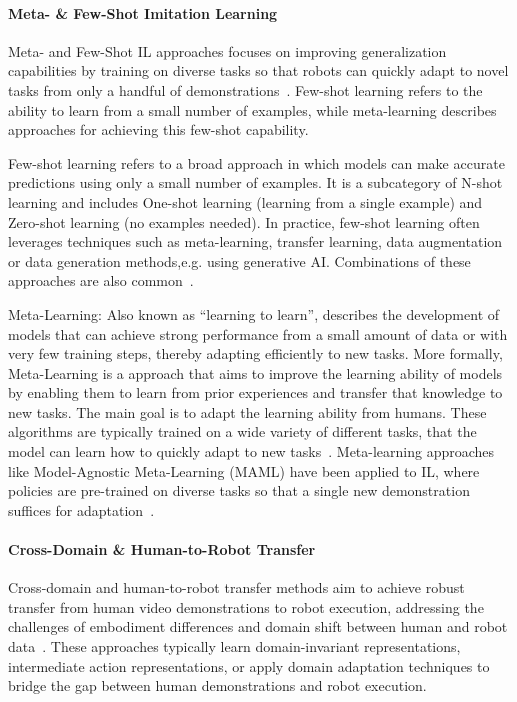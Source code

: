 \paragraph{Meta- \& Few-Shot Imitation Learning}
Meta- and Few-Shot \ac{IL} approaches focuses on improving generalization capabilities by training on diverse tasks so that robots can quickly adapt to novel tasks from only a handful of demonstrations~\cite{Eze2024LearningBW, Finn2017ModelAgnosticMF, Song2022ACS}. Few-shot learning refers to the ability to learn from a small number of examples, while meta-learning describes approaches for achieving this few-shot capability. 

Few-shot learning refers to a broad approach in which models can make accurate predictions using only a small number of examples. It is a subcategory of N-shot learning and includes One-shot learning (learning from a single example) and Zero-shot learning (no examples needed). In practice, few-shot learning often leverages techniques such as meta-learning, transfer learning, data augmentation or data generation methods,e.g. using generative \ac{AI}. Combinations of these approaches are also common~\cite{Ghadirzadeh2021BayesianMF, Song2022ACS}.

Meta-Learning: Also known as ``learning to learn'', describes the development of models that can achieve strong performance from a small amount of data or with very few training steps, thereby adapting efficiently to new tasks. More formally, Meta-Learning is a approach that aims to improve the learning ability of models by enabling them to learn from prior experiences and transfer that knowledge to new tasks. The main goal is to adapt the learning ability from humans. These algorithms are typically trained on a wide variety of different tasks, that the model can learn how to quickly adapt to new tasks~\cite{Eze2024LearningBW, Ghadirzadeh2021BayesianMF, Song2022ACS}.
Meta-learning approaches like Model-Agnostic Meta-Learning (MAML) have been applied to \ac{IL}, where policies are pre-trained on diverse tasks so that a single new demonstration suffices for adaptation~\cite{Yu2018OneShotIF}.





\paragraph{Cross-Domain \& Human-to-Robot Transfer}
Cross-domain and  human-to-robot transfer methods aim to achieve robust transfer from human video demonstrations to robot execution, addressing the challenges of embodiment differences and domain shift between human and robot data~\cite{Eze2024LearningBW}. These approaches typically learn domain-invariant representations, intermediate action representations, or apply domain adaptation techniques to bridge the gap between human demonstrations and robot execution.


